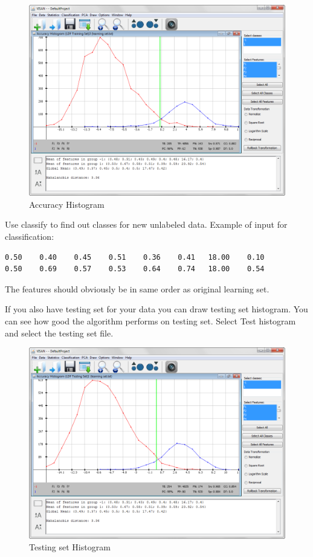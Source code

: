 \documentclass[a4paper,12pt,english]{report}
\begin{document}
\begin{figure}[htb]
\centering
\includegraphics[width=360pt]{s11.png}
\caption{Accuracy Histogram}
\end{figure}
\newpage
Use classify to find out classes for new unlabeled data. Example of input for classification:

\begin{lstlisting}
0.50    0.40    0.45    0.51    0.36    0.41   18.00    0.10  
0.50    0.69    0.57    0.53    0.64    0.74   18.00    0.54   
\end{lstlisting}

The features should obviously be in same order as original learning set. 


If you also have testing set for your data you can draw testing set histogram. You can see how good the algorithm performs on testing set. Select Test histogram and select the testing set file.

\begin{figure}[htb]
\centering
\includegraphics[width=360pt]{s12.png}
\caption{Testing set Histogram}
\end{figure}
\end{document}
